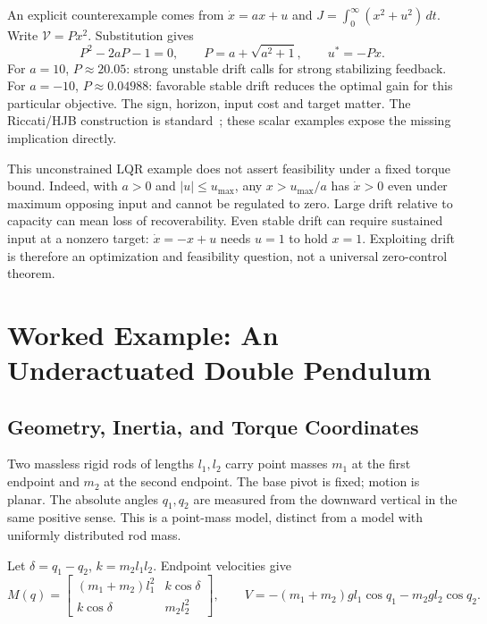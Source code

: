 An explicit counterexample comes from $\dot x=ax+u$ and $J=\int_0^\infty(x^2+u^2)\,dt$. Write $\mathcal V=Px^2$. Substitution gives
\begin{equation}
P^2-2aP-1=0,\qquad P=a+\sqrt{a^2+1},\qquad u^*=-Px.
\label{eq:ch7:minimal-control-law}
\end{equation}
\label{thm:ch7:minimal-intervention-full}
\label{eq:ch7:lqr-cost}
For $a=10$, $P\approx20.05$: strong unstable drift calls for strong stabilizing feedback. For $a=-10$, $P\approx0.04988$: favorable stable drift reduces the optimal gain for this particular objective. The sign, horizon, input cost and target matter. The Riccati/HJB construction is standard~\cite{TedrakeLqrSupplement}; these scalar examples expose the missing implication directly.

This unconstrained LQR example does not assert feasibility under a fixed torque bound. Indeed, with $a>0$ and $|u|\leq u_{\max}$, any $x>u_{\max}/a$ has $\dot x>0$ even under maximum opposing input and cannot be regulated to zero. Large drift relative to capacity can mean loss of recoverability. Even stable drift can require sustained input at a nonzero target: $\dot x=-x+u$ needs $u=1$ to hold $x=1$. Exploiting drift is therefore an optimization and feasibility question, not a universal zero-control theorem.

\section{Worked Example: An Underactuated Double Pendulum}
\label{sec:ch7:double-pendulum-full}
\label{eq:ch7:initial-condition}

\subsection{Geometry, Inertia, and Torque Coordinates}
Two massless rigid rods of lengths $l_1,l_2$ carry point masses $m_1$ at the first endpoint and $m_2$ at the second endpoint. The base pivot is fixed; motion is planar. The absolute angles $q_1,q_2$ are measured from the downward vertical in the same positive sense. This is a point-mass model, distinct from a model with uniformly distributed rod mass.

Let $\delta=q_1-q_2$, $k=m_2l_1l_2$. Endpoint velocities give
\begin{equation}
M(q)=\begin{bmatrix}(m_1+m_2)l_1^2&k\cos\delta\\k\cos\delta&m_2l_2^2\end{bmatrix},\qquad
V=-(m_1+m_2)gl_1\cos q_1-m_2gl_2\cos q_2.
\label{eq:ch7:mass-matrix}
\end{equation}

